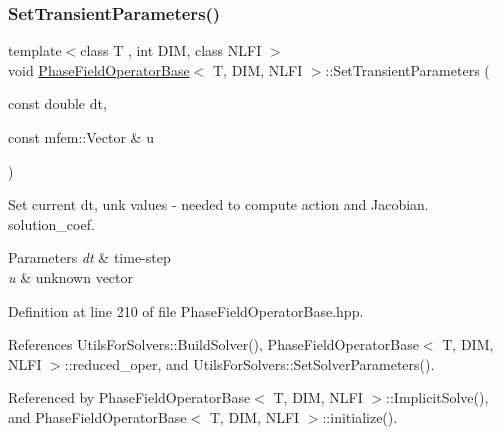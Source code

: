 \subsubsection{\texorpdfstring{Set\+Transient\+Parameters()}{SetTransientParameters()}}
{\footnotesize\ttfamily template$<$class T , int D\+IM, class N\+L\+FI $>$ \\
void \hyperlink{classPhaseFieldOperatorBase}{Phase\+Field\+Operator\+Base}$<$ T, D\+IM, N\+L\+FI $>$\+::Set\+Transient\+Parameters (\begin{DoxyParamCaption}\item[{const double}]{dt,  }\item[{const mfem\+::\+Vector \&}]{u }\end{DoxyParamCaption})}



Set current dt, unk values -\/ needed to compute action and Jacobian. solution\+\_\+coef. 


\begin{DoxyParams}{Parameters}
{\em dt} & time-\/step \\
\hline
{\em u} & unknown vector \\
\hline
\end{DoxyParams}


Definition at line 210 of file Phase\+Field\+Operator\+Base.\+hpp.



References Utils\+For\+Solvers\+::\+Build\+Solver(), Phase\+Field\+Operator\+Base$<$ T, D\+I\+M, N\+L\+F\+I $>$\+::reduced\+\_\+oper, and Utils\+For\+Solvers\+::\+Set\+Solver\+Parameters().



Referenced by Phase\+Field\+Operator\+Base$<$ T, D\+I\+M, N\+L\+F\+I $>$\+::\+Implicit\+Solve(), and Phase\+Field\+Operator\+Base$<$ T, D\+I\+M, N\+L\+F\+I $>$\+::initialize().


